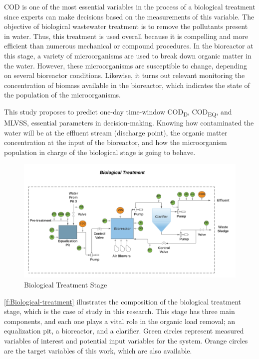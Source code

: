 \ac{COD} is one of the most essential variables in the process of a biological treatment since experts can make decisions based on the measurements of this variable. The objective of biological wastewater treatment is to remove the pollutants present in water. Thus, this treatment is used overall because it is compelling and more efficient than numerous mechanical or compound procedures. In the bioreactor at this stage, a variety of microorganisms are used to break down organic matter in the water. However, these microorganisms are susceptible to change, depending on several bioreactor conditions. Likewise, it turns out relevant monitoring the concentration of biomass available in the bioreactor, which indicates the state of the population of the microorganisms.

This study proposes to predict one-day time-window \ac{COD}\textsubscript{D}, \ac{COD}\textsubscript{EQ}, and \ac{MLVSS}, essential parameters in decision-making. Knowing how contaminated the water will be at the effluent stream (discharge point), the organic matter concentration at the input of the bioreactor, and how the microorganism population in charge of the biological stage is going to behave. 

\begin{figure}[h]
\centering
\includegraphics[width=\linewidth]{figures/Ch4/Biological-treatment-stage.pdf}
\caption{Biological Treatment Stage}
\label{f:Biological-treatment}
\end{figure}

\autoref{f:Biological-treatment} illustrates the composition of the biological treatment stage, which is the case of study in this research. This stage has three main components, and each one plays a vital role in the organic load removal; an equalization pit, a bioreactor, and a clarifier. Green circles represent measured variables of interest and potential input variables for the system. Orange circles are the target variables of this work, which are also available.

